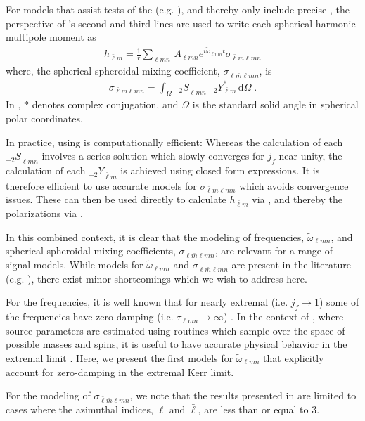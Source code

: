 \documentclass[twocolumn,aps,prd,floatfix,preprintnumbers,a4paper,nofootinbib,
superscriptaddress,10pt]{revtex4-1}
\newcommand{\cw}{\tilde{\omega}}
\def\jf{j_f}
\def\lmn{_{\ell m n}}
\def\LM{_{\bar{\ell} \bar{m}}}
\def\LMlmn{_{\bar{\ell} \bar{m} \ell m n}}
\begin{document}
%
\par For models that assist tests of the \nht{} (e.g. \cite{Berti:2005ys,London:2018gaq,Carullo:2018sfu}), and thereby only include precise , the perspective of 's second and third lines are used to write each spherical harmonic multipole moment as
%
\begin{align}
	\label{hlm}
	h\LM = \frac{1}{r} \sum\lmn \, A\lmn e^{i \cw\lmn t} \sigma\LMlmn
\end{align}
%
where, the spherical-spheroidal mixing coefficient, $\sigma\LMlmn$, is
%
\begin{align}
		\label{sigma}
		\sigma\LMlmn = \int_{\Omega} {_{-2}S}\lmn \,  {_{-2}}Y^*\LM \, \mathrm{d} \Omega \; .
\end{align}
%
In , $*$ denotes complex conjugation, and $\Omega$ is the standard solid angle in spherical polar coordinates.
%
\par In practice, using  is computationally efficient:
%
Whereas the calculation of each ${_{-2}S}\lmn$ involves a series solution which slowly converges for $\jf$ near unity, the calculation of each ${_{-2}Y}\LM$ is achieved using closed form expressions.
%
It is therefore efficient to use accurate models for $\sigma\LMlmn$ which avoids convergence issues. These can then be used directly to calculate $h\LM$ via , and thereby the \gw{} polarizations via .
%
%
\par In this combined context, it is clear that the modeling of \qnm{} frequencies, $\cw\lmn$, and spherical-spheroidal mixing coefficients, $\sigma\LMlmn$, are relevant for a range of \gw{} signal models.
%
While models for $\cw\lmn$ and $\sigma\LMlmn$ are present in the literature (e.g. \cite{Berti:2005ys,Berti:2014fga}), there exist minor shortcomings which we wish to address here.
%
\par For the \qnm{} frequencies, it is well known that for nearly extremal  (i.e. $\jf \rightarrow 1$) some of the frequencies have zero-damping (i.e. $\tau\lmn \rightarrow \infty$) \cite{Zimmerman:2015trm}.
%
In the context of \aligo{} \da{}, where source parameters are estimated using routines which sample over the space of possible \bh{} masses and spins, it is useful to have accurate physical behavior in the extremal limit \cite{TheLIGOScientific:2016wfe}.
%
Here, we present the first models for $\cw\lmn$ that explicitly account for zero-damping in the extremal Kerr limit.
%
\par For the modeling of $\sigma\LMlmn$, we note that the results presented in \cite{Berti:2014fga} are limited to cases where the azimuthal indices, $\ell$ and $\bar{\ell}$, are less than or equal to 3.
\end{document}
